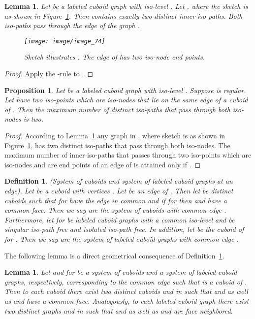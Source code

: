 \documentclass[a4paper,11pt]{article}
\newtheorem{lemma}[theorem]{Lemma}
\newtheorem{proposition}[theorem]{Proposition}
\newtheorem{definition}[theorem]{Definition}
\begin{document}
\begin{lemma}\label{lemma:connect-2}
Let  be a labeled cuboid graph with iso-level . Let ,
where the sketch  is as shown in Figure~\ref{image_74}. Then  contains exactly two distinct
inner iso-paths. Both iso-paths pass through the edge  of the graph .
\begin{figure}[!ht]
\texttt{[image: image/image\_74]}
\caption{Sketch  illustrates . The edge  of  has
two iso-node end points.}
\label{image_74}
\end{figure}
\FloatBarrier
\end{lemma}
\begin{proof}
Apply the -rule to .
\end{proof}

\begin{proposition}
Let  be a labeled cuboid graph with iso-level . Suppose  is regular.
Let  have two iso-points which are iso-nodes that lie on the same edge of a cuboid of . Then the
maximum number of distinct iso-paths that pass through both iso-nodes is two.
\label{prop:connect-1}
\end{proposition}
\begin{proof}
According to Lemma~\ref{lemma:connect-2} any graph in , where sketch  is as shown
in Figure~\ref{image_74}, has two distinct iso-paths that pass through both iso-nodes. The maximum
number of inner iso-paths that passes through two iso-points which are iso-nodes and are end points of
an edge of  is attained only if .
\end{proof}
\FloatBarrier

\begin{definition}(System of cuboids and system of labeled cuboid graphs at an edge). Let
 be a cuboid with vertices . Let  be an edge of .
Then let  be distinct cuboids such that   for  have the edge 
in common and if  for  then  and  have a common face.
Then we say  are the system of cuboids with common edge . Furthermore, let
 for  be labeled cuboid graphs with a common iso-level
 and be singular iso-path free and isolated iso-path free. In addition, let  be
the cuboid of  for . Then we say  are the system of labeled
cuboid graphs with common edge .
\label{def:system-cuboid-1}
\end{definition}

The following lemma is a direct geometrical consequence of Definition~\ref{def:system-cuboid-1}.
\begin{lemma}
Let  and  for  be a system of cuboids and a system
of labeled cuboid graphs, respectively, corresponding to the common edge  such that  is a
cuboid of . Then to each cuboid  there exist two distinct cuboids
 and  in  such that  and  as well as  and  have a
common face. Analogously, to each labeled cuboid graph  there exist two
distinct graphs  and  in  such that  and  as well as 
and  are face neighbored.
\label{lem:system-cuboid-1}
\end{lemma}
\end{document}
